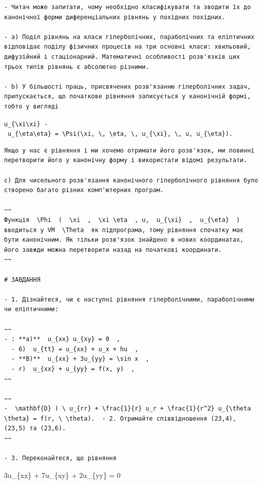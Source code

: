 \documentclass[
  ukrainian,
]{article}
\begin{document}
\begin{verbatim}
- Читач може запитати, чому необхідно класифікувати та зводити їх до канонічної форми диференціальних рівнянь у похідних похідних.

- a) Поділ рівнянь на класи гіперболічних, параболічних та еліптичних відповідає поділу фізичних процесів на три основні класи: хвильовий, дифузійний і стаціонарний. Математичні особливості розв'язків цих трьох типів рівнянь є абсолютно різними.

- b) У більшості праць, присвячених розв'язанню гіперболічних задач, припускається, що початкове рівняння записується у канонічній формі, тобто у вигляді
\end{verbatim}

\texttt{u\_\{\textbackslash{}xi\textbackslash{}xi\}\ -\ u\_\{\textbackslash{}eta\textbackslash{}eta\}\ =\ \textbackslash{}Psi(\textbackslash{}xi,\ \textbackslash{},\ \textbackslash{}eta,\ \textbackslash{},\ u\_\{\textbackslash{}xi\},\ \textbackslash{},\ u,\ u\_\{\textbackslash{}eta\}).}

\begin{verbatim}
Якщо у нас є рівняння і ми хочемо отримати його розв'язок, ми повинні перетворити його у канонічну форму і використати відомі результати.

c) Для чисельного розв'язання канонічного гіперболічного рівняння було створено багато різних комп'ютерних програм.

~~
Функція  \Phi  (  \xi  ,  \xi \eta  , u,  u_{\xi}  ,  u_{\eta}  ) вводиться у VM  \Theta  як підпрограма, тому рівняння спочатку має бути канонічним. Як тільки розв'язок знайдено в нових координатах, його завжди можна перетворити назад на початкові координати.
~~

# ЗАВДАННЯ

- 1. Дізнайтеся, чи є наступні рівняння гіперболічними, параболічними чи еліптичними:

~~
- : **a)**  u_{xx} u_{xy} = 0  ,
  - 6)  u_{tt} = u_{xx} + u_x + hu  ,
  - **B)**  u_{xx} + 3u_{yy} = \sin x  ,
  - r)  u_{xx} + u_{yy} = f(x, y)  ,
~~

~~
-  \mathbf{D} ) \ u_{rr} + \frac{1}{r} u_r + \frac{1}{r^2} u_{\theta \theta} = f(r, \ \theta).  - 2. Отримайте співвідношення (23,4), (23,5) та (23,6).
~~

- 3. Переконайтеся, що рівняння
\end{verbatim}

3u\_\{xx\} + 7u\_\{xy\} + 2u\_\{yy\} = 0
\end{document}
